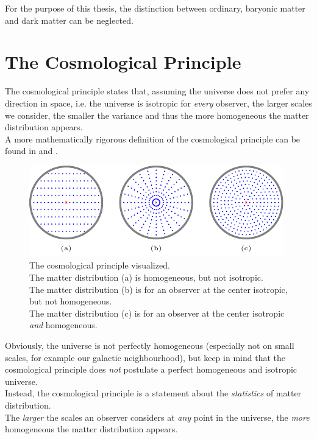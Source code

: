 \noindent For the purpose of this thesis, the distinction between ordinary, baryonic matter and dark matter can be neglected.



\section{The Cosmological Principle}

The cosmological principle states that, assuming the universe does not prefer any direction in space, i.e. the universe is isotropic for \textit{every} observer, the larger scales we consider, the smaller the variance and thus the more homogeneous the matter distribution appears. \\
A more mathematically rigorous definition of the cosmological principle can be found in \cite[p.~5]{Bartelmann2019} and \cite[p.~713/714]{MTW2017}.
\begin{figure}[H]
    \centering
    \includegraphics[scale=2.2]{figures/tikz/homogeneous-isotropic/homogeneous-isotropic}
    \caption{The cosmological principle visualized. \\
    The matter distribution (a) is homogeneous, but not isotropic. \\
    The matter distribution (b) is for an observer at the center isotropic, but not homogeneous. \\
    The matter distribution (c) is for an observer at the center isotropic \textit{and} homogeneous.}
    \label{fig:homogeneous-isotropic}
\end{figure}
\noindent Obviously, the universe is not perfectly homogeneous (especially not on small scales, for example our galactic neighbourhood), but keep in mind that the cosmological principle does \textit{not} postulate a perfect homogeneous and isotropic universe. \\
Instead, the cosmological principle is a statement about the \textit{statistics} of matter distribution. \\
The \textit{larger} the scales an observer considers at \textit{any} point in the universe, the \textit{more} homogeneous the matter distribution appears. \\


